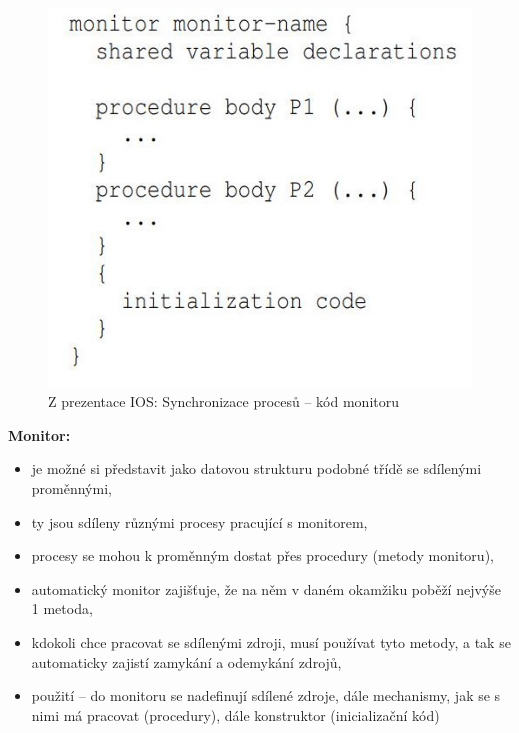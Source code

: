 \documentclass[a4paper, 11pt]{article}
\begin{document}
\begin{figure}[ht]
    \centering
    \includegraphics[scale=2]{11.1_1.jpg}
    \caption{Z prezentace IOS: Synchronizace procesů -- kód monitoru}
\end{figure}
 
\textbf{Monitor:}
\begin{itemize}
    \item je možné si představit jako datovou strukturu podobné třídě se sdílenými proměnnými,
    \item ty jsou sdíleny různými procesy pracující s monitorem,
    \item procesy se mohou k proměnným dostat přes procedury (metody monitoru),
    \item automatický monitor zajišťuje, že na něm v daném okamžiku poběží nejvýše 1 metoda,
    \item kdokoli chce pracovat se sdílenými zdroji, musí používat tyto metody, a tak se automaticky zajistí zamykání a odemykání zdrojů,
    \item použití -- do monitoru se nadefinují sdílené zdroje, dále mechanismy, jak se s nimi má pracovat (procedury), dále konstruktor (inicializační kód)
\end{itemize}
\end{document}
